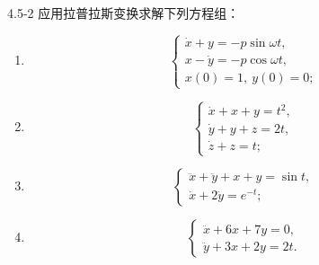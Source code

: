 \documentclass[UTF8,a4paper,11pt]{ctexart}
\begin{document}
\begin{problem}{4.5-2}
应用拉普拉斯变换求解下列方程组：
  \begin{enumerate}[label=(\arabic*)]
    \item
    \[
    \begin{cases}
      \dot{x}+y=-p\sin\omega t,\\
      x-\dot{y}=-p\cos\omega t,\\
      x(0)=1,\ y(0)=0;
    \end{cases}
    \]
    \item
    \[
    \begin{cases}
      \dot{x}+x+y=t^2,\\
      \dot{y}+y+z=2t,\\
      \dot{z}+z=t;
    \end{cases}
    \]
    \item
    \[
    \begin{cases}
      \ddot{x}+\ddot{y}+x+y=\sin t,\\
      \dot{x}+2\dot{y}=e^{-t};
    \end{cases}
    \]
    \item
    \[
    \begin{cases}
      \ddot{x}+6x+7y=0,\\
      \ddot{y}+3x+2y=2t.
    \end{cases}
    \]
  \end{enumerate}
\end{problem}
\end{document}
